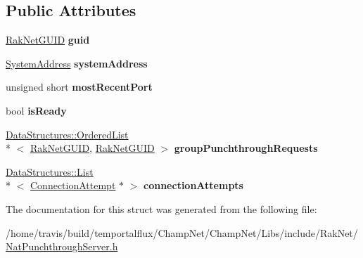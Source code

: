 \subsection*{Public Attributes}
\begin{DoxyCompactItemize}
\item 
\hypertarget{struct_rak_net_1_1_nat_punchthrough_server_1_1_user_a57831849875487367268fe43849e1854}{\hyperlink{struct_rak_net_1_1_rak_net_g_u_i_d}{Rak\-Net\-G\-U\-I\-D} {\bfseries guid}}\label{struct_rak_net_1_1_nat_punchthrough_server_1_1_user_a57831849875487367268fe43849e1854}

\item 
\hypertarget{struct_rak_net_1_1_nat_punchthrough_server_1_1_user_affe7e39baa35522e3004858132ef9af0}{\hyperlink{struct_rak_net_1_1_system_address}{System\-Address} {\bfseries system\-Address}}\label{struct_rak_net_1_1_nat_punchthrough_server_1_1_user_affe7e39baa35522e3004858132ef9af0}

\item 
\hypertarget{struct_rak_net_1_1_nat_punchthrough_server_1_1_user_a142e1a191779f6782a55e01cd7edf6d1}{unsigned short {\bfseries most\-Recent\-Port}}\label{struct_rak_net_1_1_nat_punchthrough_server_1_1_user_a142e1a191779f6782a55e01cd7edf6d1}

\item 
\hypertarget{struct_rak_net_1_1_nat_punchthrough_server_1_1_user_a840241fb451ffd441ceec7d1d409934f}{bool {\bfseries is\-Ready}}\label{struct_rak_net_1_1_nat_punchthrough_server_1_1_user_a840241fb451ffd441ceec7d1d409934f}

\item 
\hypertarget{struct_rak_net_1_1_nat_punchthrough_server_1_1_user_a08ccf3ecd80cf28d44933769f5403436}{\hyperlink{class_data_structures_1_1_ordered_list}{Data\-Structures\-::\-Ordered\-List}\\*
$<$ \hyperlink{struct_rak_net_1_1_rak_net_g_u_i_d}{Rak\-Net\-G\-U\-I\-D}, \hyperlink{struct_rak_net_1_1_rak_net_g_u_i_d}{Rak\-Net\-G\-U\-I\-D} $>$ {\bfseries group\-Punchthrough\-Requests}}\label{struct_rak_net_1_1_nat_punchthrough_server_1_1_user_a08ccf3ecd80cf28d44933769f5403436}

\item 
\hypertarget{struct_rak_net_1_1_nat_punchthrough_server_1_1_user_a666c04121b3f93f94497f2bd1b5f077c}{\hyperlink{class_data_structures_1_1_list}{Data\-Structures\-::\-List}\\*
$<$ \hyperlink{struct_rak_net_1_1_nat_punchthrough_server_1_1_connection_attempt}{Connection\-Attempt} $\ast$ $>$ {\bfseries connection\-Attempts}}\label{struct_rak_net_1_1_nat_punchthrough_server_1_1_user_a666c04121b3f93f94497f2bd1b5f077c}

\end{DoxyCompactItemize}


The documentation for this struct was generated from the following file\-:\begin{DoxyCompactItemize}
\item 
/home/travis/build/temportalflux/\-Champ\-Net/\-Champ\-Net/\-Libs/include/\-Rak\-Net/\hyperlink{_nat_punchthrough_server_8h}{Nat\-Punchthrough\-Server.\-h}\end{DoxyCompactItemize}
